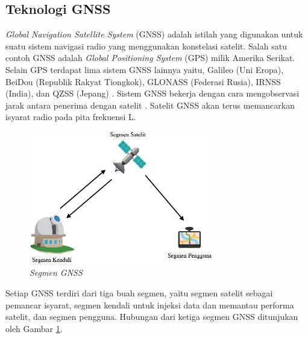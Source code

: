 \subsection{Teknologi GNSS}
\textit{Global Navigation Satellite System} (GNSS) adalah istilah yang digunakan untuk suatu sistem navigasi radio yang menggunakan konstelasi satelit. Salah satu contoh GNSS adalah \textit{Global Positioning System} (GPS) milik Amerika Serikat. Selain GPS terdapat lima sistem GNSS lainnya yaitu, Galileo (Uni Eropa), BeiDou (Republik Rakyat Tiongkok), GLONASS (Federasi Rusia), IRNSS (India), dan QZSS (Jepang) \cite{NationalCoordinationOfficeforSpace-BasedPositioning2021}. Sistem GNSS bekerja dengan cara mengobservasi jarak antara penerima dengan satelit \cite{TheEuropeanGlobalNavigationSatelliteSystemsAgency2021}. Satelit GNSS akan terus memancarkan isyarat radio pada pita frekuensi L.

\begin{figure}[ht]
	\centering
	\includegraphics[width=8cm]{contents/chapter-2/gnss_segment.jpg}
	\caption{\textit{Segmen GNSS}}
	\label{Fig: gnss_segment}
\end{figure}

Setiap GNSS terdiri dari tiga buah segmen, yaitu segmen satelit sebagai pemancar isyarat, segmen kendali untuk injeksi data dan memantau performa satelit, dan segmen pengguna. Hubungan dari ketiga segmen GNSS ditunjukan oleh Gambar \ref{Fig: gnss_segment}. 

